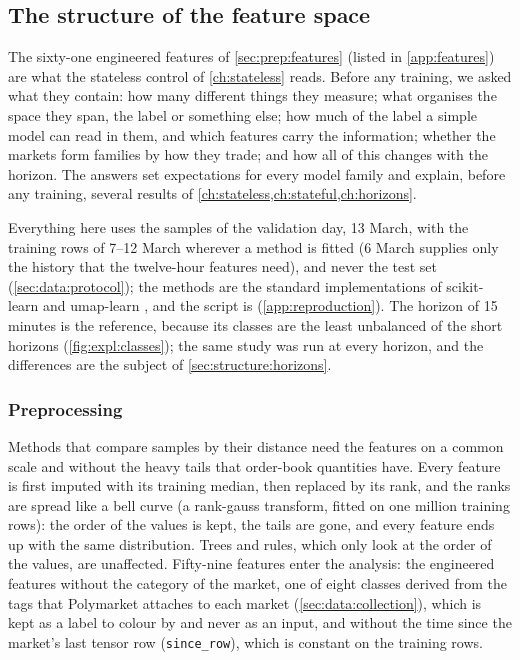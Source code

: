 \subsection{The structure of the feature space}
\label{ch:structure}

The sixty-one engineered features of \cref{sec:prep:features} (listed in
\cref{app:features}) are what the stateless control of \cref{ch:stateless} reads.  Before
any training, we asked what they contain: how many different things they measure; what
organises the space they span, the label or something else; how much of the label a
simple model can read in them, and which features carry the information; whether the
markets form families by how they trade; and how all of this changes with the horizon.
The answers set expectations for every model family and explain, before any training,
several results of \cref{ch:stateless,ch:stateful,ch:horizons}.

Everything here uses the samples of the validation day, 13 March, with the training rows
of 7--12 March wherever a method is fitted (6 March supplies only the history that the
twelve-hour features need), and never the test set
(\cref{sec:data:protocol}); the methods are the standard implementations of scikit-learn
\cite{pedregosa2011sklearn} and umap-learn \cite{mcinnes2018umap}, and the script is
 (\cref{app:reproduction}).  The horizon of 15
minutes is the reference, because its classes are the least unbalanced of the short
horizons (\cref{fig:expl:classes}); the same study was run at every horizon, and the
differences are the subject of \cref{sec:structure:horizons}.

\subsubsection{Preprocessing}
\label{sec:structure:prep}

Methods that compare samples by their distance need the features on a common scale and
without the heavy tails that order-book quantities have.  Every feature is first imputed
with its training median, then replaced by its rank, and the ranks are spread like a bell
curve (a rank-gauss transform, fitted on one million training rows): the order of the
values is kept, the tails are gone, and every feature ends up with the same distribution.
Trees and rules, which only look at the order of the values, are unaffected.  Fifty-nine
features enter the analysis: the engineered features without the category of the market,
one of eight classes derived from the tags that Polymarket attaches to each market
(\cref{sec:data:collection}), which is kept as a label to colour by and never as an
input, and without the time since the market's last tensor row (\texttt{since\_row}), which
is constant on the training rows.

